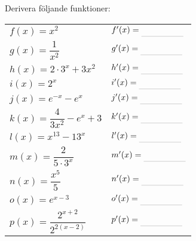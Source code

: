 \documentclass[a4paper, 12pt]{article}
\begin{document}
\newpage

\begin{blu}
    Derivera följande funktioner:
    
    \begin{itemize}
        \begin{tabular}[b]{p{10em} p{20em}}
            \item $f(x) = x^2$  & \item[] $ f'(x) \ans $ \\
            \item $g(x) = \dfrac{1}{x^2} $ & \item[] $g'(x) \ans$ \\
            \item $h(x) = 2\cdot 3^x + 3x^2 $ & \item[] $h'(x) \ans$ \\
            \item $i(x) = 2^x $ & \item[] $i'(x) \ans$\\
            \item $j(x) = e^{-x} - e^x $ & \item[] $j'(x) \ans$\\
            \item $k(x) = \dfrac{4}{3x^2}-e^x + 3 $ & \item[] $k'(x) \ans$\\
            \item $l(x) = x^{13} - 13^x $ & \item[] $ l'(x) \ans$ \\
            \item $m(x) = \dfrac{2}{5\cdot 3^x} $ & \item[] $ m'(x) \ans$ \\
            \item $n(x) = \dfrac{x^5}{5} $ & \item[] $ n'(x) \ans$ \\
            \item $o(x) = e^{x-3} $ & \item[] $ o'(x) \ans$ \\
            \item $p(x) = \dfrac{2^{x+2}}{2^{2(x-2)}}$ & \item[] $ p'(x) \ans$ \\
        \end{tabular}
    
    \end{itemize}
    
\end{blu}
\end{document}
